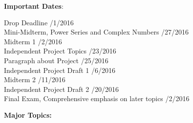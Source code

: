 \documentclass[12pt]{article}
\begin{document}
\noindent\textbf{Important Dates}:
\begin{center} \begin{minipage}{5in}
\begin{flushleft}
Drop Deadline /1/2016\\
Mini-Midterm, Power Series and Complex Numbers /27/2016\\
Midterm 1 /2/2016\\
Independent Project Topics /23/2016\\
Paragraph about Project /25/2016\\
Independent Project Draft 1 /6/2016\\
Midterm 2 /11/2016\\
Independent Project Draft 2 /20/2016\\
Final Exam, Comprehensive emphasis on later topics /2/2016\\
\end{flushleft}
\end{minipage}
\end{center}


\noindent \textbf{Major Topics:} 
\end{document}
